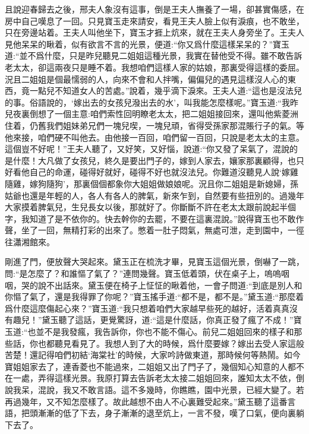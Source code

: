 


\begin{parag}
    且說迎春歸去之後，邢夫人象沒有這事，倒是王夫人撫養了一場，卻甚實傷感，在房中自己嘆息了一回。只見寶玉走來請安，看見王夫人臉上似有淚痕，也不敢坐，只在旁邊站着。王夫人叫他坐下，寶玉才捱上炕來，就在王夫人身旁坐了。王夫人見他呆呆的瞅着，似有欲言不言的光景，便道:“你又爲什麼這樣呆呆的？”寶玉道:“並不爲什麼，只是昨兒聽見二姐姐這種光景，我實在替他受不得。雖不敢告訴老太太，卻這兩夜只是睡不着。我想咱們這樣人家的姑娘，那裏受得這樣的委屈。況且二姐姐是個最懦弱的人，向來不會和人拌嘴，偏偏兒的遇見這樣沒人心的東西，竟一點兒不知道女人的苦處。”說着，幾乎滴下淚來。王夫人道:“這也是沒法兒的事。俗語說的，‘嫁出去的女孩兒潑出去的水’，叫我能怎麼樣呢。”寶玉道:“我昨兒夜裏倒想了一個主意:咱們索性回明瞭老太太，把二姐姐接回來，還叫他紫菱洲住着，仍舊我們姐妹弟兄們一塊兒喫，一塊兒頑，省得受孫家那混賬行子的氣。等他來接，咱們硬不叫他去。由他接一百回，咱們留一百回，只說是老太太的主意。這個豈不好呢！”王夫人聽了，又好笑，又好惱，說道:“你又發了呆氣了，混說的是什麼！大凡做了女孩兒，終久是要出門子的，嫁到人家去，孃家那裏顧得，也只好看他自己的命運，碰得好就好，碰得不好也就沒法兒。你難道沒聽見人說‘嫁雞隨雞，嫁狗隨狗’，那裏個個都象你大姐姐做娘娘呢。況且你二姐姐是新媳婦，孫姑爺也還是年輕的人，各人有各人的脾氣，新來乍到，自然要有些扭別的。過幾年大家摸着脾氣兒，生兒長女以後，那就好了。你斷斷不許在老太太跟前說起半個字，我知道了是不依你的。快去幹你的去罷，不要在這裏混說。”說得寶玉也不敢作聲，坐了一回，無精打彩的出來了。憋着一肚子悶氣，無處可泄，走到園中，一徑往瀟湘館來。
\end{parag}


\begin{parag}
    剛進了門，便放聲大哭起來。黛玉正在梳洗才畢，見寶玉這個光景，倒嚇了一跳，問:“是怎麼了？和誰慪了氣了？”連問幾聲。寶玉低着頭，伏在桌子上，嗚嗚咽咽，哭的說不出話來。黛玉便在椅子上怔怔的瞅着他，一會子問道:“到底是別人和你慪了氣了，還是我得罪了你呢？”寶玉搖手道:“都不是，都不是。”黛玉道:“那麼着爲什麼這麼傷起心來？”寶玉道:“我只想着咱們大家越早些死的越好，活着真真沒有趣兒！”黛玉聽了這話，更覺驚訝，道:“這是什麼話，你真正發了瘋了不成！”寶玉道:“也並不是我發瘋，我告訴你，你也不能不傷心。前兒二姐姐回來的樣子和那些話，你也都聽見看見了。我想人到了大的時候，爲什麼要嫁？嫁出去受人家這般苦楚！還記得咱們初結‘海棠社’的時候，大家吟詩做東道，那時候何等熱鬧。如今寶姐姐家去了，連香菱也不能過來，二姐姐又出了門子了，幾個知心知意的人都不在一處，弄得這樣光景。我原打算去告訴老太太接二姐姐回來，誰知太太不依，倒說我呆，混說，我又不敢言語。這不多幾時，你瞧瞧，園中光景，已經大變了。若再過幾年，又不知怎麼樣了。故此越想不由人不心裏難受起來。”黛玉聽了這番言語，把頭漸漸的低了下去，身子漸漸的退至炕上，一言不發，嘆了口氣，便向裏躺下去了。
\end{parag}


